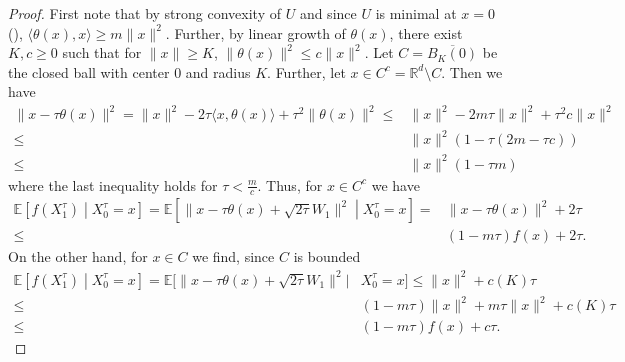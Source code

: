 \documentclass[10pt,a4paper]{amsart}
\newcommand{\R}{\mathbb{R}}
\begin{document}
\begin{proof}
    First note that by strong convexity of $U$ and since $U$ is minimal at $x=0$ (), $\langle\theta(x),x\rangle\geq m\|x\|^2$. Further, by linear growth of $\theta(x)$, there exist $K,c\geq 0$ such that for $\|x\|\geq K$, $\|\theta(x)\|^2\leq c\|x\|^2$. Let $C = \overline{B_{K}(0)}$ be the closed ball with center $0$ and radius $K$. Further, let $x \in C^c = \R^d \setminus C$. Then we have
    \begin{equation}\label{eq:lyapunov1}
        \begin{aligned}
            \|x-\tau\theta(x)\|^2 = \|x\|^2 - 2\tau\langle x,\theta(x)\rangle + \tau^2\|\theta(x)\|^2
            \leq & \|x\|^2 - 2m\tau\|x\|^2 + \tau^2c\|x\|^2\\
            \leq &\|x\|^2 \left( 1 - \tau \left(2m-\tau c \right)\right)\\
            \leq &\|x\|^2 \left( 1 - \tau m\right)
        \end{aligned}
    \end{equation}
    where the last inequality holds for $\tau<\frac{m}{c}$. Thus, for $x\in C^c$ we have
    \begin{equation*}         
        \begin{aligned}
            \mathbb{E} \left[ f(X_1^\tau) \middle| X_0^\tau = x \right]
            = \mathbb{E} \left[ \|x-\tau\theta(x) + \sqrt{2\tau} W_1\|^2 \middle| X_0^\tau = x \right]
            = &\|x-\tau\theta(x)\|^2 + 2\tau \\
            \leq &(1-m\tau)f(x) + 2\tau.
        \end{aligned}   
    \end{equation*}
    On the other hand, for $x\in C$ we find, since $C$ is bounded
    \begin{equation*}         
        \begin{aligned}
            \mathbb{E} \left[ f(X_1^\tau) \middle| X_0^\tau = x \right]
            = \mathbb{E} \bigg[\|x-\tau\theta(x) + \sqrt{2\tau} W_1\|^2 \bigg| &X_0^\tau = x \bigg]
            \leq  \|x\|^2 + c(K)\tau \\
            \leq & (1-m\tau)\|x\|^2 + m\tau \|x\|^2 + c(K)\tau \\
            \leq & (1-m\tau)f(x) + c \tau.
        \end{aligned}   
    \end{equation*}
\end{proof}
\end{document}
